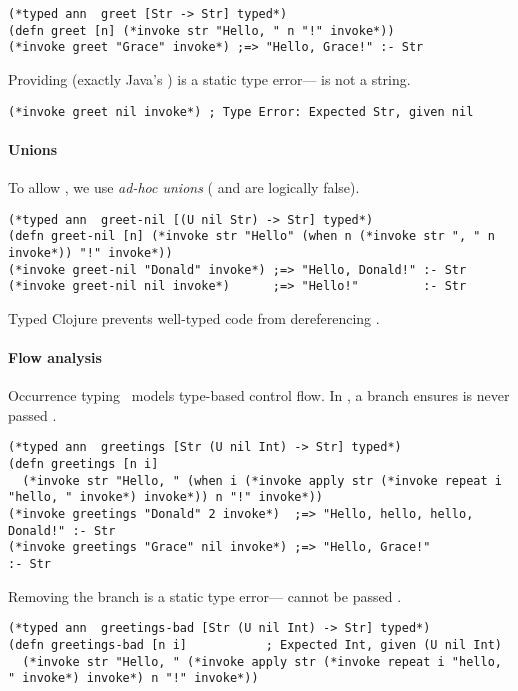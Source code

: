 \begin{lstlisting}
(*typed ann  greet [Str -> Str] typed*)
(defn greet [n] (*invoke str "Hello, " n "!" invoke*))
(*invoke greet "Grace" invoke*) ;=> "Hello, Grace!" :- Str
\end{lstlisting}
%
Providing  (exactly Java's )
is a static type error--- is not a string.
%
\begin{lstlisting}
(*invoke greet nil invoke*) ; Type Error: Expected Str, given nil
\end{lstlisting}

\paragraph{Unions} To allow , we use \emph{ad-hoc unions} ( and 
are logically false).
%
\begin{lstlisting}
(*typed ann  greet-nil [(U nil Str) -> Str] typed*)
(defn greet-nil [n] (*invoke str "Hello" (when n (*invoke str ", " n invoke*)) "!" invoke*))
(*invoke greet-nil "Donald" invoke*) ;=> "Hello, Donald!" :- Str 
(*invoke greet-nil nil invoke*)      ;=> "Hello!"         :- Str
\end{lstlisting}
%
%
Typed Clojure prevents well-typed code from dereferencing .

\paragraph{Flow analysis} Occurrence typing~\cite{TF10}
models type-based control flow.
In , a branch ensures 
is never passed .
%
\begin{lstlisting}
(*typed ann  greetings [Str (U nil Int) -> Str] typed*)
(defn greetings [n i]
  (*invoke str "Hello, " (when i (*invoke apply str (*invoke repeat i "hello, " invoke*) invoke*)) n "!" invoke*))
(*invoke greetings "Donald" 2 invoke*)  ;=> "Hello, hello, hello, Donald!" :- Str
(*invoke greetings "Grace" nil invoke*) ;=> "Hello, Grace!"                :- Str
\end{lstlisting}
%
Removing the branch is a static type error--- cannot be passed .
%
\begin{lstlisting}
(*typed ann  greetings-bad [Str (U nil Int) -> Str] typed*)
(defn greetings-bad [n i]           ; Expected Int, given (U nil Int)
  (*invoke str "Hello, " (*invoke apply str (*invoke repeat i "hello, " invoke*) invoke*) n "!" invoke*))
\end{lstlisting}


